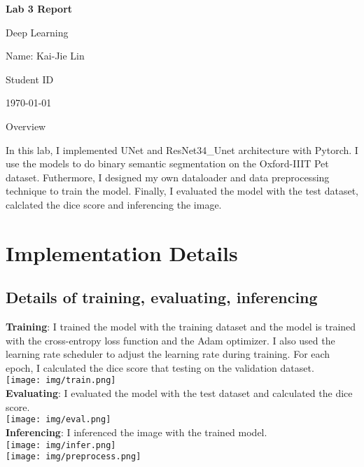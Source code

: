 \documentclass{article} %
\newcommand{\question}[2][]{\begin{flushleft}\textbf{Question #1}: \textit{#2}\end{flushleft}}
\newcommand{\maketitletwo}[2][]{\begin{center}
        \Large{\textbf{Lab 3 Report}
        
            Deep Learning} %
        \vspace{5pt}
        
        \normalsize{
            Name: Kai-Jie Lin 
            
            Student ID\: 110652019
            
            \today}
        \vspace{15pt}
        \end{center}}
\begin{document}
    \maketitletwo[5]  %
    
    \section{Overview}

    In this lab, I implemented UNet and ResNet34\_Unet architecture with Pytorch.
    I use the models to do binary semantic segmentation on the Oxford-IIIT Pet dataset.
    Futhermore, I designed my own dataloader and data preprocessing technique to train the model.
    Finally, I evaluated the model with the test dataset, calclated the dice score and inferencing the image.

    \section{Implementation Details}
    \subsection{Details of training, evaluating, inferencing}
    \textbf{Training}: 
    I trained the model with the training dataset and the model is trained with the cross-entropy loss function and the Adam optimizer.
    I also used the learning rate scheduler to adjust the learning rate during training.
    For each epoch, I calculated the dice score that testing on the validation dataset. \\
    \texttt{[image: img/train.png]} \\
    \textbf{Evaluating}:
    I evaluated the model with the test dataset and calculated the dice score. \\
    \texttt{[image: img/eval.png]} \\
    \textbf{Inferencing}:
    I inferenced the image with the trained model. \\
    \texttt{[image: img/infer.png]} \\
    \texttt{[image: img/preprocess.png]} \\
\end{document}

